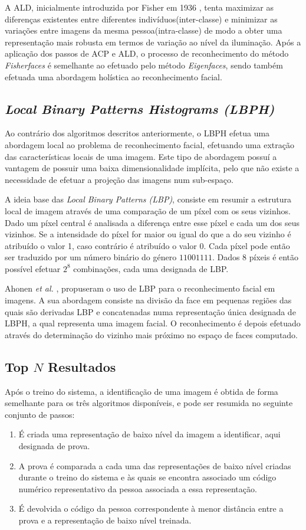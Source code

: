 A ALD, inicialmente introduzida por Fisher em 1936 \cite{FISHER1936}, tenta maximizar as diferenças existentes entre diferentes indivíduos(inter-classe) e minimizar as variações entre imagens da mesma pessoa(intra-classe) de modo a obter uma representação mais robusta em termos de variação ao nível da iluminação. Após a aplicação dos passos de ACP e ALD, o processo de reconhecimento do método \textit{Fisherfaces} é semelhante ao efetuado pelo método \textit{Eigenfaces}, sendo também efetuada uma abordagem holística ao reconhecimento facial.


\subsection{\textit{Local Binary Patterns Histograms (LBPH)}} \label{sec:lbph}
Ao contrário dos algoritmos descritos anteriormente, o LBPH efetua uma abordagem local ao problema de reconhecimento facial, efetuando uma extração das características locais de uma imagem. Este tipo de abordagem possuí a vantagem de possuir uma baixa dimensionalidade implícita, pelo que não existe a necessidade de efetuar a projeção das imagens num sub-espaço.

A ideia base das \textit{Local Binary Patterns (LBP)}, consiste em resumir a estrutura local de imagem através de uma comparação de um píxel com os seus vizinhos. Dado um píxel central é analisada a diferença entre esse píxel e cada um dos seus vizinhos. Se a intensidade do píxel for maior ou igual do que a do seu vizinho é atribuído o valor 1, caso contrário é atribuído o valor 0. Cada píxel pode então ser traduzido por um número binário do género $11001111$. Dados $8$ píxeis é então possível efetuar $2^8$ combinações, cada uma designada de LBP.

Ahonen \textit{et al.} \cite{ahonen2004face}, propuseram o uso de LBP para o reconhecimento facial em imagens. A sua abordagem consiste na divisão da face em pequenas regiões das quais são derivadas LBP e concatenadas numa representação única designada de LBPH, a qual representa uma imagem facial. O reconhecimento é depois efetuado através do determinação do vizinho mais próximo no espaço de faces computado.

\subsection{Top $N$ Resultados} \label{sec:topn}
Após o treino do sistema, a identificação de uma imagem é obtida de forma semelhante para os três algoritmos disponíveis, e pode ser resumida no seguinte conjunto de passos:
\begin{enumerate}
\item É criada uma representação de baixo nível da imagem a identificar, aqui designada de prova.
\item A prova é comparada a cada uma das representações de baixo nível criadas durante o treino do sistema e às quais se encontra associado um código numérico representativo da pessoa associada a essa representação.
\item É devolvida o código da pessoa correspondente à menor distância entre a prova e a representação de baixo nível treinada.
\end{enumerate}

